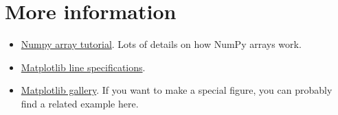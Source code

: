

\section{More information}

\begin{itemize}
    \item \href{https://numpy.org/devdocs/user/quickstart.html}{Numpy array tutorial}. Lots of details on how NumPy arrays work.
    \item \href{https://matplotlib.org/api/pyplot_api.html#matplotlib.pyplot.plot}{Matplotlib line specifications}.
    \item \href{https://matplotlib.org/3.1.1/gallery/index.html}{Matplotlib gallery}. If you want to make a special figure, you can probably find a related example here.
\end{itemize}


